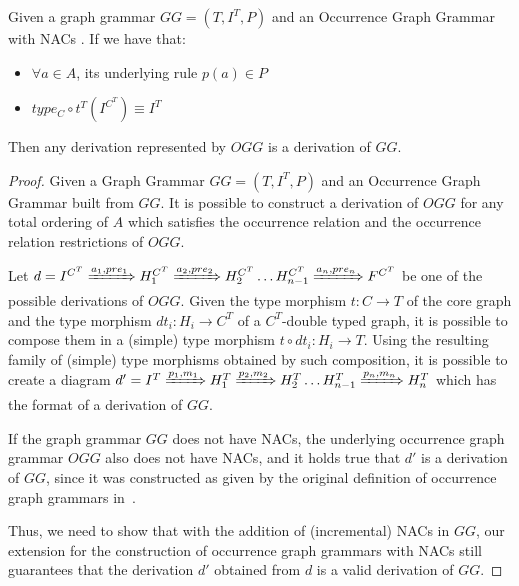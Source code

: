 \begin{thm} Given a graph grammar $GG = (T,I^T,P)$ and an Occurrence Graph Grammar with NACs \occurrenceGrammar{}. If we have that:
\begin{itemize}
  \item $\forall a \in A$, its underlying rule $p(a) \in P$
  \item $type_{C} \circ t^T(I^{C^T}) \equiv I^T$
\end{itemize}

Then any derivation represented by $OGG$ is a derivation of $GG$.

\end{thm}

\begin{proof}
  Given a Graph Grammar $GG = (T,I^T,P)$ and an Occurrence Graph Grammar \occurrenceGrammar{} built from $GG$.
  It is possible to construct a derivation of $OGG$ for any total ordering of $A$ which satisfies the occurrence relation and the occurrence relation restrictions of $OGG$.

  Let \mbox{$d = I^{C^T} \xRightarrow{a_1, pre_1} H_1^{C^T} \xRightarrow{a_2, pre_2} H_2^{C^T} \ldots H_{n-1}^{C^T} \xRightarrow{a_n, pre_n} F^{C^T}$} be one of the possible derivations of $OGG$.
  Given the type morphism $t: C \rightarrow T$ of the core graph and the type morphism $dt_i : H_i \rightarrow C^T$ of a $C^T$-double typed graph, it is possible to compose them in a (simple) type morphism $t \circ dt_i : H_i \rightarrow T$. 
  Using the resulting family of (simple) type morphisms obtained by such composition, it is possible to create a diagram \mbox{$d' = I^T \xRightarrow{p_1, m_1} H_1^T \xRightarrow{p_2,m_2} H_2^T \ldots H_{n-1}^T \xRightarrow{p_n, m_n} H_n^T$} which has the format of a derivation of $GG$.

  If the graph grammar $GG$ does not have NACs, the underlying occurrence graph grammar $OGG$ also does not have NACs, and it holds true that $d'$ is a derivation of $GG$, since it was constructed as given by the original definition of occurrence graph grammars in~\cite{Corradini1996}.

  Thus, we need to show that with the addition of (incremental) NACs in $GG$, our extension for the construction of occurrence graph grammars with NACs still guarantees that the derivation $d'$ obtained from $d$ is a valid derivation of $GG$.


\end{proof}
